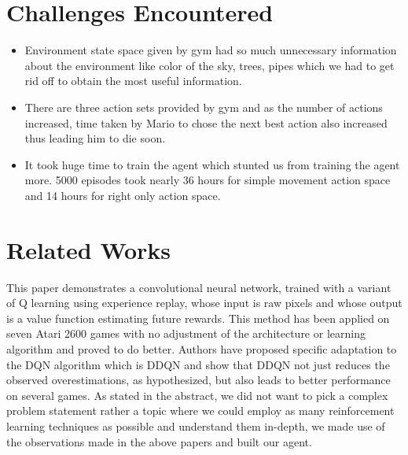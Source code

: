 \documentclass[conference]{IEEEtran}
\theoremstyle{definition}
\begin{document}
\section{Challenges Encountered}
\begin{itemize}
  \item Environment state space given by gym had so much unnecessary information about the environment like color of the sky, trees, pipes which we had to get rid off to obtain the most useful information.
  \item There are three action sets provided by gym and as the number of actions increased, time taken by Mario to chose the next best action also increased thus leading him to die soon.
  \item It took huge time to train the agent which stunted us from training the agent more. 5000 episodes took nearly 36 hours for simple movement action space and 14 hours for right only action space.
\end{itemize}
\section{Related Works}
\cite{mnih2013playing} This paper demonstrates a convolutional neural network, trained with a variant of Q learning using experience replay, whose input is raw pixels and whose output is a value function estimating future rewards. This method has been applied on seven Atari 2600 games with no adjustment of the architecture or learning algorithm and proved to do better.
\cite{van2016deep} Authors have proposed specific adaptation to the DQN algorithm which is DDQN and show that DDQN not just reduces the observed overestimations, as hypothesized, but also leads to better performance on several games.
As stated in the abstract, we did not want to pick a complex problem statement rather a topic where we could employ as many reinforcement learning techniques as possible and understand them in-depth, we made use of the observations made in the above papers and built our agent.
\end{document}
